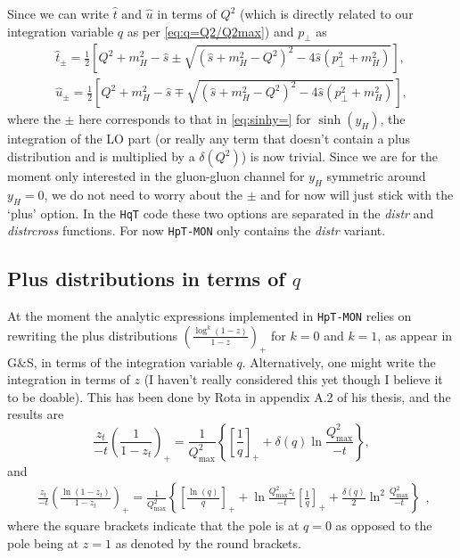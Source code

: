 \documentclass[10pt]{report}
\begin{document}
Since we can write $\hat{t}$ and $\hat{u}$ in terms of $Q^2$ (which is directly related to our integration variable $q$ as per \eqref{eq:q=Q2/Q2max}) and $p_\perp$ as
\begin{equation}
\begin{array}{l}
\hat{t}_\pm=\frac{1}{2}\left[Q^{2}+m_H^{2}-\hat{s}\pm\sqrt{\left(\hat{s}+m_H^{2}-Q^{2}\right)^{2}-4 \hat{s}\left(p_{\perp}^{2}+m_H^{2}\right)}\right], \\
\hat{u}_\pm=\frac{1}{2}\left[Q^{2}+m_H^{2}-\hat{s}\mp\sqrt{\left(\hat{s}+m_H^{2}-Q^{2}\right)^{2}-4 \hat{s}\left(p_{\perp}^{2}+m_H^{2}\right)}\right],
\end{array}
\label{eq:utpm=}
\end{equation}
where the $\pm$ here corresponds to that in \eqref{eq:sinhy=} for $\sinh(y_H)$, the integration of the LO part (or really any term that doesn't contain a plus distribution and is multiplied by a $\delta(Q^2)$) is now trivial. Since we are for the moment only interested in the gluon-gluon channel for $y_H$ symmetric around $y_H=0$, we do not need to worry about the $\pm$ and for now will just stick with the `plus' option. In the \texttt{HqT} code these two options are separated in the \textit{distr} and \textit{distrcross} functions. For now \texttt{HpT-MON} only contains the \textit{distr} variant.

\subsection{Plus distributions in terms of $q$}
\label{subsec:plusintermsofq}
At the moment the analytic expressions implemented in \texttt{HpT-MON} relies on rewriting the plus distributions $\left( \frac{\log ^k (1-z) }{ 1-z } \right)_+$ for $k=0$ and $k=1$, as appear in G\&S, in terms of the integration variable $q$. Alternatively, one might write the integration in terms of $z$  (I haven't really considered this yet though I believe it to be doable). This has been done by Rota in appendix A.2 of his thesis, and the results are 
\begin{equation}
\frac{z_{t}}{-t}\left(\frac{1}{1-z_{t}}\right)_{+}=\frac{1}{Q_{\max }^{2}}\left\{\left[\frac{1}{q}\right]_{+}+\delta(q) \ln \frac{Q_{\max }^{2}}{-t}\right\},
\label{eq:order0plus}
\end{equation}
and
\begin{equation}
\begin{aligned}
\frac{z_{t}}{-t}\left(\frac{\ln \left(1-z_{t}\right)}{1-z_{t}}\right)_{+}=\frac{1}{Q_{\max }^{2}}\left\{\left[\frac{\ln (q)}{q}\right]_{+}+\ln \frac{Q_{\max }^{2} z_{t}}{-t}\left[\frac{1}{q}\right]_{+}+\frac{\delta(q)}{2} \ln ^{2} \frac{Q_{\max }^{2}}{-t}\right\}
\end{aligned},
\label{eq:order1plus}
\end{equation}
where the square brackets indicate that the pole is at $q=0$ as opposed to the pole being at $z=1$ as denoted by the round brackets. 
\end{document}
